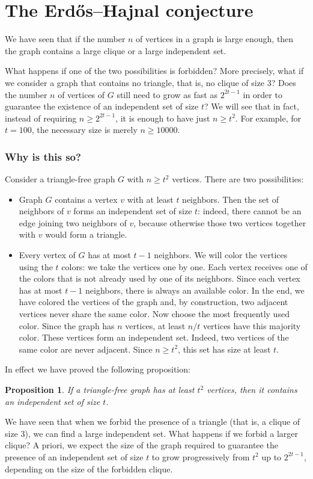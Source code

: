 \documentclass{amsart}
\newtheorem*{proposition}{Proposition}
\begin{document}
\section{The Erd\H os--Hajnal conjecture}

We have seen that if the number $n$ of vertices in a graph is large
enough, then the graph contains a large clique or a large independent
set.

What happens if one of the two possibilities is forbidden? More
precisely, what if we consider a graph that contains no triangle, that
is, no clique of size $3$? Does the number $n$ of vertices of $G$ still
need to grow as fast as $2^{2t-1}$ in order to guarantee the existence
of an independent set of size $t$? We will see that in fact, instead of
requiring $n\geq2^{2t-1}$, it is enough to have just $n\geq t^2$. For
example, for $t=100$, the necessary size is merely $n\geq10000$.

\subsubsection{Why is this so?}
Consider a triangle-free graph $G$ with $n\geq t^{2}$ vertices. There
are two possibilities:
\begin{itemize}
\item 
  Graph $G$ contains a vertex $v$ with at least $t$
  neighbors. Then the set of neighbors of $v$ forms an independent set
  of size $t$: indeed, there cannot be an edge joining two neighbors of
  $v$, because otherwise those two vertices together with $v$ would form
  a triangle.
\item
  Every vertex of $G$ has at most $t-1$ neighbors. We will
  color the vertices using the $t$ colors: we
  take the vertices one by one. Each vertex receives one of the
  colors that is not already used by one of its neighbors. Since each
  vertex has at most $t-1$ neighbors, there is always an available
  color. In the end, we have colored the vertices of the graph and, by
  construction, two adjacent vertices never share the same color. Now
  choose the most frequently used color. Since the graph has $n$
  vertices, at least $n/t$ vertices have this majority color. These
  vertices form an independent set. Indeed, two vertices of the same
  color are never adjacent. Since $n\geq t^2$, this set has size at least
  $t$.
\end{itemize}
In effect we have proved the following proposition:
\begin{proposition}
  If a triangle-free graph has at least $t^{2}$ vertices, then it
  contains an independent set of size $t$.
\end{proposition}
We have seen that when we forbid the presence of a triangle (that is,
a clique of size $3$), we can find a large independent set. What
happens if we forbid a larger clique? A priori, we expect the size of
the graph required to guarantee the presence of an independent set of
size $t$ to grow progressively from $t^{2}$ up to $2^{2t-1}$, depending
on the size of the forbidden clique.
\end{document}

